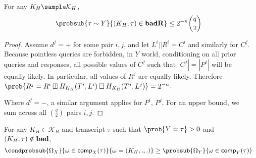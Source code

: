 \documentclass[eprint.tex]{subfiles}
\begin{document}
\begin{lemma} \label{badR}
    For any $K_H \sample \mathcal{K}_H$,
    \begin{displaymath}
        \probsub{\tau \sim Y}{(K_H, \tau) \in \badR}
        \leq 2^{-n} \binom{q}{2}
    \end{displaymath}
\end{lemma}

\begin{proof}
    Assume $d^j = +$ for some pair $i, j$, and let $L^i || R^i = C^i$ and similarly for $C^j$.
    Because pointless queries are forbidden, in $Y$ world,
    conditioning on all prior queries and responses,
    all possible values of $C^j$ such that $|C^j| = |P^j|$ will be equally likely.
    In particular, all values of $R^j$ are equally likely. Therefore
    $\prob{R^j = R^i \boxplus H_{K_H}(T^i, L^i) \boxminus H_{K_H}(T^j, L^j)} = 2^{-n}$.

    Where $d^j = -$, a similar argument applies for $P^i$, $P^j$.
    For an upper bound, we sum across all $\binom{q}{2}$ pairs $i, j$.
\end{proof}

\begin{lemma} \label{notbad}
    For any $K_H \in \mathcal{K}_H$ and transcript $\tau$ such that $\prob{Y = \tau} > 0$ and
    $(K_H, \tau) \notin \operatorname{\mathbf{bad}}$,
    \begin{displaymath}
        \condprobsub{\Omega_X}{\omega \in \comp_X(\tau)}{\omega = (K_H, ., .)}
        \geq
        \probsub{\Omega_Y}{\omega \in \comp_Y(\tau)}
    \end{displaymath}
\end{lemma}
\end{document}

